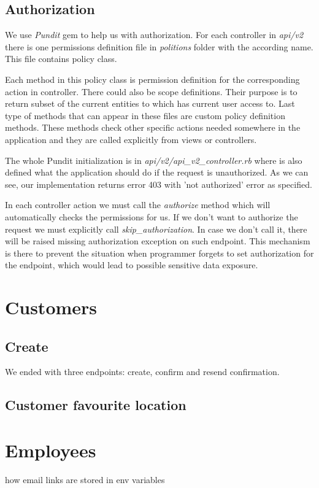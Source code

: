 \subsection {Authorization}
We use \textit{Pundit} gem to help us with authorization. For each controller in \textit{api/v2} there is one permissions definition file in \textit{politions} folder with the according name.  This file contains policy class. 

Each method in this policy class is permission definition for the corresponding action in controller. There could also be scope definitions. Their purpose is to return subset of the current entities to which has current user access to. Last type of methods that can appear in these files are custom policy definition methods. These methods check other specific actions needed somewhere in the application and they are called explicitly from views or controllers.

The whole Pundit initialization is in \textit{api/v2/api\_v2\_controller.rb} where is also defined what the application should do if the request is unauthorized. As we can see, our implementation returns error 403 with 'not authorized' error as specified.

In each controller action we must call the \textit{authorize} method which will automatically checks the permissions for us. If we don't want to authorize the request we must explicitly call \textit{skip\_authorization}. In case we don't call it, there will be raised missing authorization exception on such endpoint. This mechanism is there to prevent the situation when programmer forgets to set authorization for the endpoint, which would lead to possible sensitive data exposure.

\section {Customers}
\subsection{Create}
We ended with three endpoints: create, confirm and resend confirmation. 

\subsection{Customer favourite location}

\section {Employees}
how email links are stored in env variables
